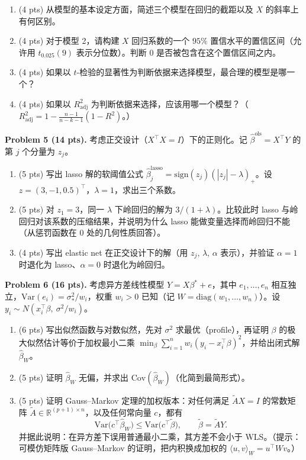 \documentclass[11pt]{ctexart}
\begin{document}
\begin{enumerate}
\item (4 pts) 从模型的基本设定方面，简述三个模型在回归的截距以及 $X$ 的斜率上有何区别。
\item (4 pts) 对于模型 2，请构建 $X$ 回归系数的一个 $95\%$ 置信水平的置信区间（允许用 $t_{0.025}(9)$ 表示分位数）。判断 $0$ 是否被包含在这个置信区间之内。
\item (4 pts) 如果以 $t$-检验的显著性为判断依据来选择模型，最合理的模型是哪一个？
\item (4 pts) 如果以 $R^2_{\mathrm{adj}}$ 为判断依据来选择，应该用哪一个模型？（$R^2_{\mathrm{adj}} = 1 - \frac{n-1}{n-k-1}(1-R^2)$。）
\end{enumerate}

\noindent\textbf{Problem 5 (14 pts).} 考虑正交设计（$X^{\top}X = I$）下的正则化。记 $\hat\beta^{\mathrm{ols}} = X^{\top}Y$ 的第 $j$ 个分量为 $z_j$。
\begin{enumerate}
\item (5 pts) 写出 lasso 解的软阈值公式 $\hat\beta_j^{\mathrm{lasso}} = \mathrm{sign}(z_j)(|z_j| - \lambda)_+$。设 $z = (3, -1, 0.5)^{\top}$，$\lambda = 1$，求出三个系数。
\item (5 pts) 对 $z_1 = 3$，同一 $\lambda$ 下岭回归的解为 $3/(1+\lambda)$。比较此时 lasso 与岭回归对该系数的压缩结果，并说明为什么 lasso 能做变量选择而岭回归不能（从惩罚函数在 $0$ 处的几何性质回答）。
\item (4 pts) 写出 elastic net 在正交设计下的解（用 $z_j$, $\lambda$, $\alpha$ 表示），并验证 $\alpha = 1$ 时退化为 lasso、$\alpha = 0$ 时退化为岭回归。
\end{enumerate}

\noindent\textbf{Problem 6 (16 pts).} 考虑异方差线性模型 $Y = X\beta^* + e$，其中 $e_1, \ldots, e_n$ 相互独立，$\mathrm{Var}(e_i) = \sigma_*^2 / w_i$，权重 $w_i > 0$ 已知（记 $W = \mathrm{diag}(w_1, \ldots, w_n)$）。设 $y_i \sim N(x_i^{\top}\beta,\ \sigma^2/w_i)$。
\begin{enumerate}
\item (6 pts) 写出似然函数与对数似然，先对 $\sigma^2$ 求最优（profile），再证明 $\beta$ 的极大似然估计等价于加权最小二乘 $\min_\beta \sum_{i=1}^n w_i(y_i - x_i^{\top}\beta)^2$，并给出闭式解 $\hat\beta_W$。
\item (5 pts) 证明 $\hat\beta_W$ 无偏，并求出 $\mathrm{Cov}(\hat\beta_W)$（化简到最简形式）。
\item (5 pts) 证明 Gauss--Markov 定理的加权版本：对任何满足 $\tilde{A}X = I$ 的常数矩阵 $\tilde{A} \in \mathbb{R}^{(p+1)\times n}$，以及任何常向量 $c$，都有
\[
\mathrm{Var}\big(c^{\top}\hat\beta_W\big) \leq \mathrm{Var}\big(c^{\top}\tilde\beta\big), \qquad \tilde\beta = \tilde{A}Y.
\]
并据此说明：在异方差下误用普通最小二乘，其方差不会小于 WLS。（提示：可模仿矩阵版 Gauss--Markov 的证明，把内积换成加权的 $\langle u, v\rangle_W = u^{\top}Wv$。）
\end{enumerate}
\end{document}
